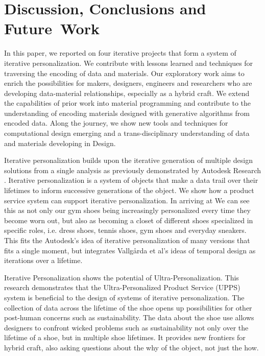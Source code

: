 \section{Discussion, Conclusions and Future~Work}
In this paper, we reported on four iterative projects that form a system of iterative personalization. We contribute with lessons learned and techniques for traversing the encoding of data and materials. Our exploratory work aims to enrich the possibilities for makers, designers, engineers and researchers who are developing data-material relationships, especially as a hybrid craft. We extend the capabilities of prior work into material programming \cite{Vallgarda2016} and contribute to the understanding of encoding materials designed with generative algorithms from encoded data. Along the journey, we show new tools and techniques for computational design emerging and a trans-disciplinary understanding of data and materials developing in Design. 

Iterative personalization builds upon the iterative generation of multiple design solutions from a single analysis as previously demonstrated by Autodesk Research \cite{Nourbakhsh2016}. Iterative personalization is a system of objects that make a data trail over their lifetimes to inform successive generations of the object. We show how a product service system can support iterative personalization. In arriving at  We can see this as not only our gym shoes being increasingly personalized every time they become worn out, but also as becoming a closet of different shoes specialized in specific roles, i.e. dress shoes, tennis shoes, gym shoes and everyday sneakers. This fits the Autodesk's idea of iterative personalization of many versions that fits a single moment, but integrates Vallg\aa rda et al's ideas of temporal design \cite{Vallgarda2015} as iterations over a lifetime. 

Iterative Personalization shows the potential of Ultra-Personalization. 
This research demonstrates that the Ultra-Personalized Product Service (UPPS) system is beneficial to the design of systems of  iterative personalization. 
The collection of data across the lifetime of the shoe opens up possibilities for other post-human concerns such as sustainability. The data about the shoe use allows designers to confront wicked problems such as sustainability not only over the lifetime of a shoe, but in multiple shoe lifetimes. It provides new frontiers for hybrid craft, also asking questions about the why of the object, not just the how. 

